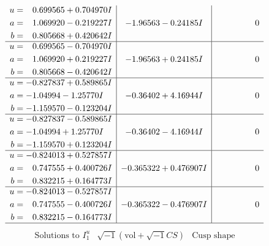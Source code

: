 \documentclass[1p]{elsarticle_modified}
\theoremstyle{definition}
\newcommand{\I}{\sqrt{-1}}
\begin{document}
$$\begin{array}{c|c|c}
\begin{aligned}
u &= \phantom{-}0.699565 + 0.704970 I \\
a &= \phantom{-}1.069920 - 0.219227 I \\
b &= \phantom{-}0.805668 + 0.420642 I\end{aligned}
 & -1.96563 - 0.24185 I & \phantom{-0.000000 } 0 \\ \hline\begin{aligned}
u &= \phantom{-}0.699565 - 0.704970 I \\
a &= \phantom{-}1.069920 + 0.219227 I \\
b &= \phantom{-}0.805668 - 0.420642 I\end{aligned}
 & -1.96563 + 0.24185 I & \phantom{-0.000000 } 0 \\ \hline\begin{aligned}
u &= -0.827837 + 0.589865 I \\
a &= -1.04994 - 1.25770 I \\
b &= -1.159570 - 0.123204 I\end{aligned}
 & -0.36402 + 4.16944 I & \phantom{-0.000000 } 0 \\ \hline\begin{aligned}
u &= -0.827837 - 0.589865 I \\
a &= -1.04994 + 1.25770 I \\
b &= -1.159570 + 0.123204 I\end{aligned}
 & -0.36402 - 4.16944 I & \phantom{-0.000000 } 0 \\ \hline\begin{aligned}
u &= -0.824013 + 0.527857 I \\
a &= \phantom{-}0.747555 + 0.400726 I \\
b &= \phantom{-}0.832215 + 0.164773 I\end{aligned}
 & -0.365322 + 0.476907 I & \phantom{-0.000000 } 0 \\ \hline\begin{aligned}
u &= -0.824013 - 0.527857 I \\
a &= \phantom{-}0.747555 - 0.400726 I \\
b &= \phantom{-}0.832215 - 0.164773 I\end{aligned}
 & -0.365322 - 0.476907 I & \phantom{-0.000000 } 0\\
 \hline 
 \end{array}$$\newpage$$\begin{array}{c|c|c}  
\text{Solutions to }I^u_{1}& \I (\text{vol} + \sqrt{-1}CS) & \text{Cusp shape}\\
 \hline 
\begin{aligned}

\end{aligned}
\end{array}$$
\end{document}
